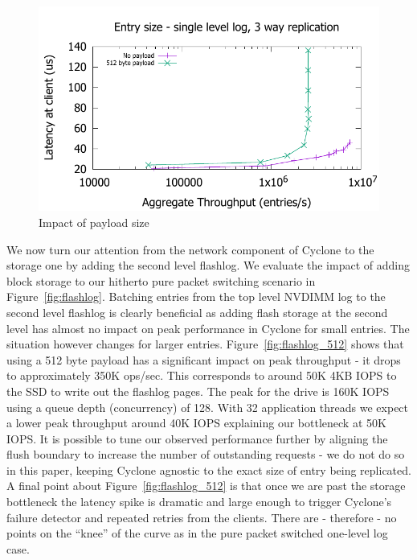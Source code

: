 \documentclass[10pt, preprint, nonatbib]{sigplanconf}
\begin{document}
\begin{figure}
\includegraphics[scale=0.6]{results2/512.pdf}
\caption{Impact of payload size}
\label{fig:payload}
\end{figure}

We now turn our attention from the network component of Cyclone to the storage
one by adding the second level flashlog. We evaluate the impact of adding
block storage to our hitherto pure packet switching scenario in
Figure~\ref{fig:flashlog}. Batching entries from the top level NVDIMM log to the
second level flashlog is clearly beneficial as adding flash storage at the
second level has almost no impact on peak performance in Cyclone for small
entries. The situation however changes for larger
entries. Figure~\ref{fig:flashlog_512} shows that using a 512 byte payload has a
significant impact on peak throughput - it drops to approximately 350K
ops/sec. This corresponds to around 50K 4KB IOPS to the SSD to write out the
flashlog pages. The peak for the drive is 160K IOPS using a queue depth
(concurrency) of 128. With 32 application threads we expect a lower peak
throughput around 40K IOPS explaining our bottleneck at 50K IOPS.  It is
possible to tune our observed performance further by aligning the flush boundary
to increase the number of outstanding requests - we do not do so in this paper,
keeping Cyclone agnostic to the exact size of entry being replicated. A final
point about Figure~\ref{fig:flashlog_512} is that once we are past the storage
bottleneck the latency spike is dramatic and large enough to trigger Cyclone's
failure detector and repeated retries from the clients. There are - therefore -
no points on the ``knee'' of the curve as in the pure packet switched one-level
log case.
\end{document}
